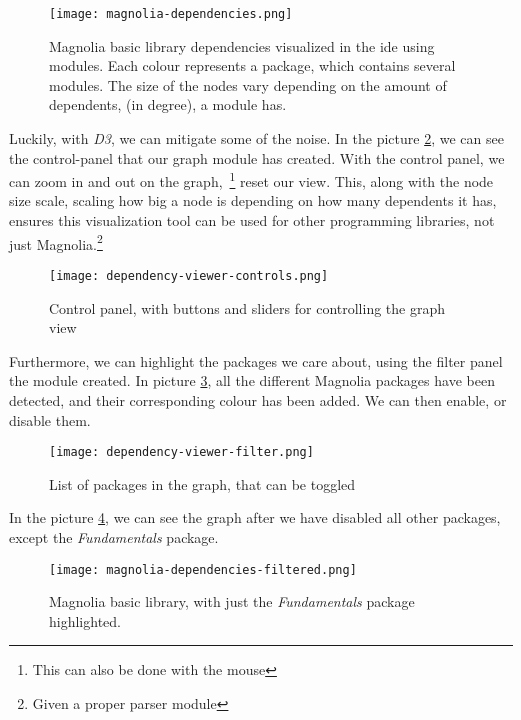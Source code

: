 \begin{figure}[H]
  \centering
  \texttt{[image: magnolia-dependencies.png]}
  \caption{
    Magnolia basic library dependencies visualized in the \gls*{ide} using
    modules. Each colour represents a package, which contains several modules.
    The size of the nodes vary depending on the amount of dependents,
    (in degree), a module has.
  }
  \label{pic:magLib}
\end{figure}

Luckily, with \textit{D3}, we can mitigate some of the noise. In the picture
\ref{pic:depCont}, we can see the control-panel that our graph module has
created. With the control panel, we can zoom in and out on the graph,~\footnote{This can also be done with the mouse}
reset our view. This, along with the node size scale, scaling how big
a node is depending on how many dependents it has, ensures this visualization
tool can be used for other programming libraries, not just Magnolia.\footnote{Given a proper parser module}

\begin{figure}[H]
  \centering
  \texttt{[image: dependency-viewer-controls.png]}
  \caption{
    Control panel, with buttons and sliders for controlling the graph view
  }
  \label{pic:depCont}
\end{figure}

Furthermore, we can highlight the packages we care about, using the filter
panel the module created. In picture \ref{pic:depFil}, all the different
Magnolia packages have been detected, and their corresponding colour has been
added. We can then enable, or disable them.

\begin{figure}[H]
  \centering
  \texttt{[image: dependency-viewer-filter.png]}
  \caption{List of packages in the graph, that can be toggled}
  \label{pic:depFil}
\end{figure}

In the picture \ref{pic:depDis}, we can see the graph after we have disabled all
other packages, except the \textit{Fundamentals} package.

\begin{figure}[H]
  \centering
  \texttt{[image: magnolia-dependencies-filtered.png]}
  \caption{
    Magnolia basic library, with just the \textit{Fundamentals} package
    highlighted.
  }
  \label{pic:depDis}
\end{figure}


